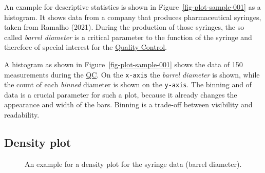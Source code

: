 \documentclass[
  a4paper,
]{scrbook}
\begin{document}
An example for descriptive statistics is shown in
Figure~\ref{fig-plot-sample-001} as a histogram. It shows data from a
company that produces pharmaceutical syringes, taken from Ramalho
(2021). During the production of those syringes, the so called
\emph{barrel diameter} is a critical parameter to the function of the
syringe and therefore of special interest for the \hyperref[QC]{Quality
Control}.

A histogram as shown in Figure~\ref{fig-plot-sample-001} shows the data
of 150 measurements during the \hyperref[QC]{QC}. On the \texttt{x-axis}
the \emph{barrel diameter} is shown, while the count of each
\emph{binned} diameter is shown on the \texttt{y-axis}. The binning and
of data is a crucial parameter for such a plot, because it already
changes the appearance and width of the bars. Binning is a trade-off
between visibility and readability.

\subsection{Density plot}\label{density-plot}

\begin{figure}[ht]


\caption{\label{fig-plot-density}An example for a density plot for the
syringe data (barrel diameter).}

\end{figure}%
\end{document}
